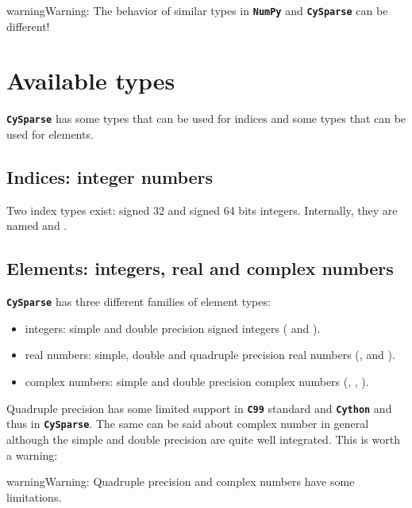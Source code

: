 \documentclass[letterpaper,10pt,english]{sphinxmanual}
\begin{document}
\begin{notice}{warning}{Warning:}
The behavior of similar types in \textbf{\texttt{NumPy}} and \textbf{\texttt{CySparse}} can be different!
\end{notice}


\section{Available types}
\label{types:availabe-types}\label{types:available-types}
\textbf{\texttt{CySparse}} has some types that can be used for indices and some types that can be used for elements.


\subsection{Indices: integer numbers}
\label{types:indices-integer-numbers}
Two index types exist: signed 32 and signed 64 bits integers. Internally, they are named  and .


\subsection{Elements: integers, real and complex numbers}
\label{types:elements-integers-real-and-complex-numbers}
\textbf{\texttt{CySparse}} has three different families of element types:
\begin{itemize}
\item {} 
integers: simple and double precision signed integers ( and ).

\item {} 
real numbers: simple, double and quadruple precision real numbers (,  and ).

\item {} 
complex numbers: simple and double precision complex numbers (, , ).

\end{itemize}

Quadruple precision has some limited support in \textbf{\texttt{C99}} standard and \textbf{\texttt{Cython}} and thus in \textbf{\texttt{CySparse}}. The same can be said about complex number in general although the simple and double precision are quite
well integrated. This is worth a warning:

\begin{notice}{warning}{Warning:}
Quadruple precision and complex numbers have some limitations.
\end{notice}
\end{document}
